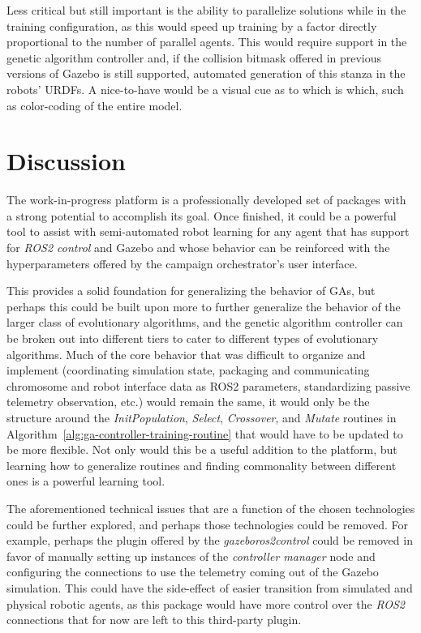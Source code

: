 \documentclass[conference]{IEEEtran}
\begin{document}
	Less critical but still important is the ability to parallelize solutions while in the training configuration, as this would speed up training by a factor directly proportional to the number of parallel agents. This would require support in the genetic algorithm controller and, if the collision bitmask offered in previous versions of Gazebo is still supported, automated generation of this stanza in the robots' URDFs. A nice-to-have would be a visual cue as to which is which, such as color-coding of the entire model.

	\section{Discussion}

	The work-in-progress platform is a professionally developed set of packages with a strong potential to accomplish its goal. Once finished, it could be a powerful tool to assist with semi-automated robot learning for any agent that has support for \textit{ROS2 control} and Gazebo and whose behavior can be reinforced with the hyperparameters offered by the campaign orchestrator's user interface.

	This provides a solid foundation for generalizing the behavior of \acp{GA}, but perhaps this could be built upon more to further generalize the behavior of the larger class of evolutionary algorithms, and the genetic algorithm controller can be broken out into different tiers to cater to different types of evolutionary algorithms. Much of the core behavior that was difficult to organize and implement (coordinating simulation state, packaging and communicating chromosome and robot interface data as ROS2 parameters, standardizing passive telemetry observation, etc.) would remain the same, it would only be the structure around the \textit{InitPopulation}, \textit{Select}, \textit{Crossover}, and \textit{Mutate} routines in Algorithm~\ref{alg:ga-controller-training-routine} that would have to be updated to be more flexible. Not only would this be a useful addition to the platform, but learning how to generalize routines and finding commonality between different ones is a powerful learning tool.

	The aforementioned technical issues that are a function of the chosen technologies could be further explored, and perhaps those technologies could be removed. For example, perhaps the plugin offered by the \textit{gazebo\textunderscore ros2\textunderscore control} could be removed in favor of manually setting up instances of the \textit{controller manager} node and configuring the connections to use the telemetry coming out of the Gazebo simulation. This could have the side-effect of easier transition from simulated and physical robotic agents, as this package would have more control over the \textit{ROS2} connections that for now are left to this third-party plugin.
\end{document}
